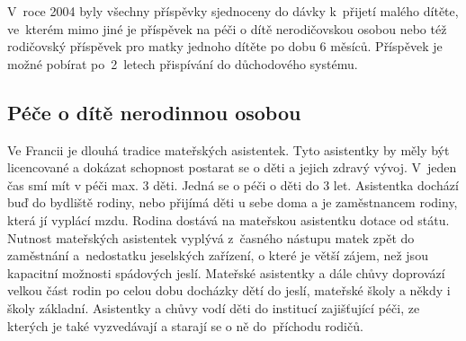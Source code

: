 				V roce 2004 byly všechny příspěvky sjednoceny do dávky k přijetí malého dítěte, ve kterém mimo jiné je příspěvek na péči o dítě nerodičovskou osobou nebo též rodičovský příspěvek pro matky jednoho dítěte po dobu 6 měsíců. Příspěvek je možné pobírat po 2 letech přispívání do důchodového systému. \citep{Dennipece}

			\subsection{Péče o dítě nerodinnou osobou}
				Ve Francii je dlouhá tradice mateřských asistentek. Tyto asistentky by měly být licencované a dokázat schopnost postarat se o děti a jejich zdravý vývoj. V jeden čas smí mít v péči max. 3 děti. Jedná se o péči o děti do 3 let. Asistentka dochází buď do bydliště rodiny, nebo přijímá děti u sebe doma a je zaměstnancem rodiny, která jí vyplácí mzdu. Rodina dostává na mateřskou asistentku dotace od státu.
				Nutnost mateřských asistentek vyplývá z časného nástupu matek zpět do zaměstnání a nedostatku jeselských zařízení, o které je větší zájem, než jsou kapacitní možnosti spádových jeslí. Mateřské asistentky a dále chůvy doprovází velkou část rodin po celou dobu docházky dětí do jeslí, mateřské školy a někdy i školy základní. Asistentky a chůvy vodí děti do institucí zajišťující péči, ze kterých je také vyzvedávají a starají se o ně do příchodu rodičů.
